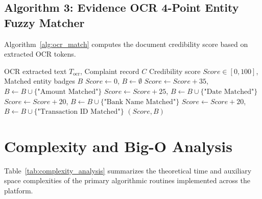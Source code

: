 \subsection{Algorithm 3: Evidence OCR 4-Point Entity Fuzzy Matcher}
Algorithm~\ref{alg:ocr_match} computes the document credibility score based on extracted OCR tokens.

\begin{algorithm}[h]
\caption{Four-Point Documentary Credibility Scoring}
\label{alg:ocr_match}
\begin{algorithmic}[1]
\Require OCR extracted text $T_{\text{ocr}}$, Complaint record $C$
\Ensure Credibility score $Score \in [0, 100]$, Matched entity badges $B$
\State $Score \gets 0$, $B \gets \emptyset$
    \State $Score \gets Score + 35$, $B \gets B \cup \{\text{"Amount Matched"}\}$
\EndIf
{}
    \State $Score \gets Score + 25$, $B \gets B \cup \{\text{"Date Matched"}\}$
\EndIf
{}
    \State $Score \gets Score + 20$, $B \gets B \cup \{\text{"Bank Name Matched"}\}$
\EndIf
{}
    \State $Score \gets Score + 20$, $B \gets B \cup \{\text{"Transaction ID Matched"}\}$
\EndIf
\State \Return $(Score, B)$
\end{algorithmic}
\end{algorithm}

\section{Complexity and Big-O Analysis}
Table~\ref{tab:complexity_analysis} summarizes the theoretical time and auxiliary space complexities of the primary algorithmic routines implemented across the platform.

